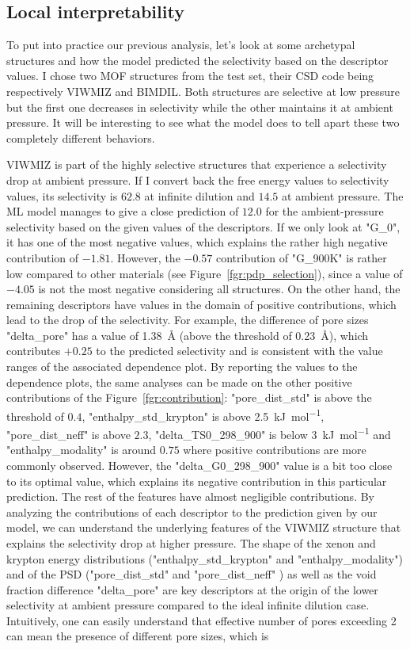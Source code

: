 \documentclass[main]{subfiles}
\begin{document}
\subsection{Local interpretability}

To put into practice our previous analysis, let's look at some archetypal structures and how the model predicted the selectivity based on the descriptor values. I chose two MOF structures from the test set, their CSD code being respectively VIWMIZ and BIMDIL. Both structures are selective at low pressure but the first one decreases in selectivity while the other maintains it at ambient pressure. It will be interesting to see what the model does to tell apart these two completely different behaviors.

VIWMIZ is part of the highly selective structures that experience a selectivity drop at ambient pressure. If I convert back the free energy values to selectivity values, its selectivity is $62.8$ at infinite dilution and $14.5$ at ambient pressure. The ML model manages to give a close prediction of $12.0$ for the ambient-pressure selectivity based on the given values of the descriptors. If we only look at "G\_0", it has one of the most negative values, which explains the rather high negative contribution of $-1.81$. However, the $-0.57$ contribution of "G\_900K" is rather low compared to other materials (see Figure~\ref{fgr:pdp_selection}), since a value of $-4.05$ is not the most negative considering all structures. On the other hand, the remaining descriptors have values in the domain of positive contributions, which lead to the drop of the selectivity. For example, the difference of pore sizes "delta\_pore" has a value of \SI{1.38}{\angstrom} (above the threshold of \SI{0.23}{\angstrom}), which contributes $+0.25$ to the predicted selectivity and is consistent with the value ranges of the associated dependence plot. By reporting the values to the dependence plots, the same analyses can be made on the other positive contributions of the Figure~\ref{fgr:contribution}: "pore\_dist\_std" is above the threshold of $0.4$, "enthalpy\_std\_krypton" is above \SI{2.5}{\kilo\joule\per\mole}, "pore\_dist\_neff" is above $2.3$, "delta\_TS0\_298\_900" is below \SI{3}{\kilo\joule\per\mole} and "enthalpy\_modality" is around $0.75$ where positive contributions are more commonly observed. However, the "delta\_G0\_298\_900" value is a bit too close to its optimal value, which explains its negative contribution in this particular prediction. The rest of the features have almost negligible contributions. By analyzing the contributions of each descriptor to the prediction given by our model, we can understand the underlying features of the VIWMIZ structure that explains the selectivity drop at higher pressure. The shape of the xenon and krypton energy distributions ("enthalpy\_std\_krypton" and "enthalpy\_modality") and of the PSD ("pore\_dist\_std" and "pore\_dist\_neff" ) as well as the void fraction difference "delta\_pore" are key descriptors at the origin of the lower selectivity at ambient pressure compared to the ideal infinite dilution case. Intuitively, one can easily understand that effective number of pores exceeding 2 can mean the presence of different pore sizes, which is 
\end{document}

